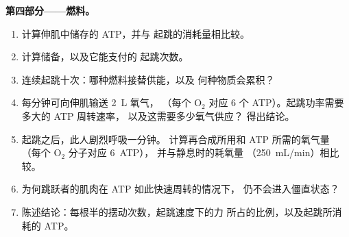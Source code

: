\begin{problem}
\medskip
\noindent\textbf{第四部分——燃料。}
\begin{enumerate}[resume]
  \item 计算伸肌中储存的 ATP，并与
        起跳的消耗量相比较。
  \item 计算储备，以及它能支付的
        起跳次数。
  \item 连续起跳十次：哪种燃料接替供能，以及
        何种物质会累积？
  \item {}每分钟可向伸肌输送 \qty{2}{L} 氧气，
        （每个 $\mathrm{O_2}$ 对应 6 个 ATP）。起跳功率需要多大的 ATP 周转速率，
        以及这需要多少氧气供应？
        得出结论。
  \item 起跳之后，此人剧烈呼吸一分钟。
        计算再合成所用和 ATP 所需的氧气量
        （每个 $\mathrm{O_2}$ 分子对应 \qty{6}{ATP}），
        并与静息时的耗氧量
        （\qty{250}{mL/min}）相比较。
  \item 为何跳跃者的肌肉在 ATP 如此快速周转的情况下，
        仍不会进入僵直状态？
  \item 陈述结论：每根半的摆动次数，起跳速度下的力
        所占的比例，以及起跳所消耗的 ATP。
\end{enumerate}
\end{problem}
